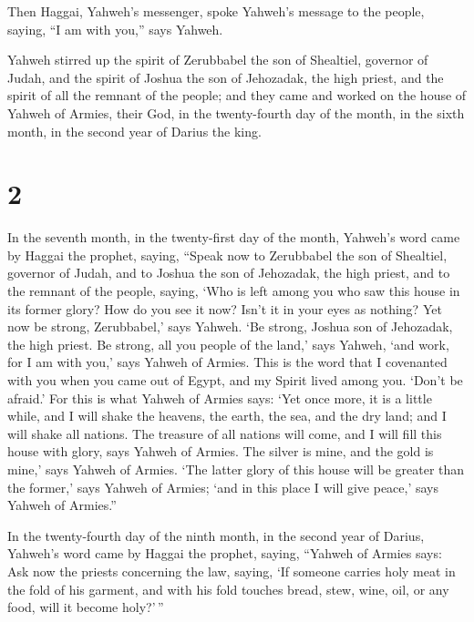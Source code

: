  Then Haggai, Yahweh's messenger, spoke Yahweh's message
to the people, saying, ``I am with you,'' says Yahweh.

 Yahweh stirred up the spirit of Zerubbabel the son of
Shealtiel, governor of Judah, and the spirit of Joshua the son of
Jehozadak, the high priest, and the spirit of all the remnant of the
people; and they came and worked on the house of Yahweh of Armies, their
God,  in the twenty-fourth day of the month, in the sixth
month, in the second year of Darius the king.

\hypertarget{section-1}{%
\section{2}\label{section-1}}

 In the seventh month, in the twenty-first day of the
month, Yahweh's word came by Haggai the prophet, saying, 
``Speak now to Zerubbabel the son of Shealtiel, governor of Judah, and
to Joshua the son of Jehozadak, the high priest, and to the remnant of
the people, saying,  `Who is left among you who saw this
house in its former glory? How do you see it now? Isn't it in your eyes
as nothing?  Yet now be strong, Zerubbabel,' says Yahweh.
`Be strong, Joshua son of Jehozadak, the high priest. Be strong, all you
people of the land,' says Yahweh, `and work, for I am with you,' says
Yahweh of Armies.  This is the word that I covenanted with
you when you came out of Egypt, and my Spirit lived among you. `Don't be
afraid.'  For this is what Yahweh of Armies says: `Yet
once more, it is a little while, and I will shake the heavens, the
earth, the sea, and the dry land;  and I will shake all
nations. The treasure of all nations will come, and I will fill this
house with glory, says Yahweh of Armies.  The silver is
mine, and the gold is mine,' says Yahweh of Armies.  `The
latter glory of this house will be greater than the former,' says Yahweh
of Armies; `and in this place I will give peace,' says Yahweh of
Armies.''

 In the twenty-fourth day of the ninth month, in the
second year of Darius, Yahweh's word came by Haggai the prophet, saying,
 ``Yahweh of Armies says: Ask now the priests concerning
the law, saying,  `If someone carries holy meat in the
fold of his garment, and with his fold touches bread, stew, wine, oil,
or any food, will it become holy?'\,''


